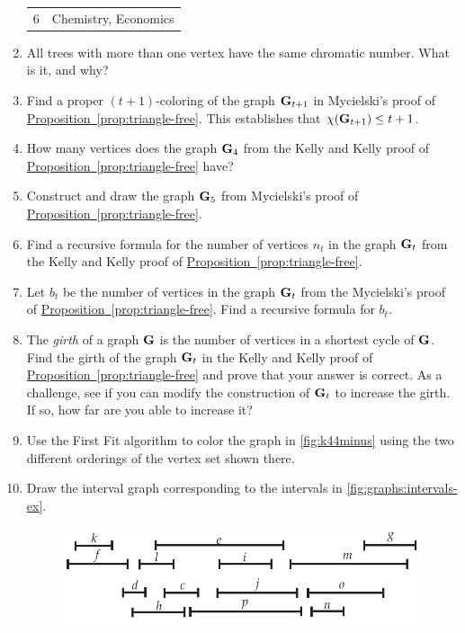 \begin{enumerate}
\begin{center}
\begin{tabular}{c|l}
      6 & Chemistry, Economics
    \end{tabular}
  \end{center}
\item All trees with more than one vertex have the same chromatic
  number. What is it, and why?
\item \label{ex:color} Find a proper $(t+1)$-coloring of the
  graph $\mathbf{G}_{t+1}$ in Mycielski's proof of
  \hyperref[prop:triangle-free]{Proposition~\ref*{prop:triangle-free}}. This
  establishes that $\chi(\mathbf{G}_{t+1})\leq t+1$.
\item How many vertices does the graph $\mathbf{G}_4$ from the Kelly and
  Kelly proof of
  \hyperref[prop:triangle-free]{Proposition~\ref*{prop:triangle-free}}
  have?
\item Construct and draw the graph $\mathbf{G}_5$ from Mycielski's proof of
  \hyperref[prop:triangle-free]{Proposition~\ref*{prop:triangle-free}}.
\item Find a recursive formula for the number of vertices $n_t$ in the
  graph $\mathbf{G}_t$ from the Kelly and Kelly proof of
  \hyperref[prop:triangle-free]{Proposition~\ref*{prop:triangle-free}}.
\item Let $b_t$ be the number of vertices in the graph $\mathbf{G}_t$ from
  the Mycielski's proof of
  \hyperref[prop:triangle-free]{Proposition~\ref*{prop:triangle-free}}. Find
  a recursive formula for $b_t$.
\item The \emph{girth} of a graph $\mathbf{G}$ is the number of vertices in
  a shortest cycle of $\mathbf{G}$. Find the girth of the graph $\mathbf{G}_t$ in
  the Kelly and Kelly proof of
  \hyperref[prop:triangle-free]{Proposition~\ref*{prop:triangle-free}}
  and prove that your answer is correct. As a challenge, see if you
  can modify the construction of $\mathbf{G}_t$ to increase the girth. If
  so, how far are you able to increase it?
\item \label{ex:graphs:first-fit-color}Use the First Fit algorithm to
  color the graph in \autoref{fig:k44minus} using the two different
  orderings of the vertex set shown there.
\item Draw the interval graph corresponding to the intervals in
  \autoref{fig:graphs:intervals-ex}.
  \begin{figure}[h]
    \centering
    \includegraphics{graphs-figs/firstfit-intgraph}

\end{figure}
\end{enumerate}
